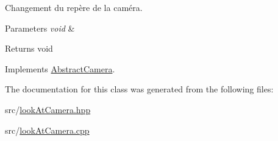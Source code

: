 Changement du repère de la caméra. 


\begin{DoxyParams}{Parameters}
{\em void} & \\
\hline
\end{DoxyParams}
\begin{DoxyReturn}{Returns}
void 
\end{DoxyReturn}


Implements \hyperlink{class_abstract_camera_a4bfcc6ed8980d64cf1d43d7dcb60129b}{Abstract\+Camera}.



The documentation for this class was generated from the following files\+:\begin{DoxyCompactItemize}
\item 
src/\hyperlink{look_at_camera_8hpp}{look\+At\+Camera.\+hpp}\item 
src/\hyperlink{look_at_camera_8cpp}{look\+At\+Camera.\+cpp}\end{DoxyCompactItemize}
